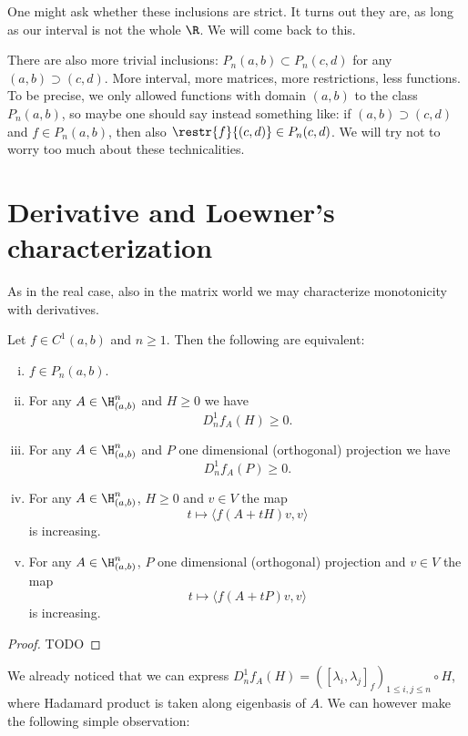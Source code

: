One might ask whether these inclusions are strict. It turns out they are, as long as our interval is not the whole $\R$. We will come back to this.

There are also more trivial inclusions: $P_{n}(a, b) \subset P_{n}(c, d)$ for any $(a, b) \supset (c, d)$. More interval, more matrices, more restrictions, less functions. To be precise, we only allowed functions with domain $(a, b)$ to the class $P_{n}(a, b)$, so maybe one should say instead something like: if $(a, b) \supset (c, d)$ and $f \in P_{n}(a, b)$, then also $\restr{f}{(c, d)} \in P_{n}(c, d)$. We will try not to worry too much about these technicalities.

\section{Derivative and Loewner's characterization}

As in the real case, also in the matrix world we may characterize monotonicity with derivatives.

\begin{lause}\label{monotone_derivative}
	Let $f \in C^{1}(a, b)$ and $n \geq 1$. Then the following are equivalent:
	\begin{enumerate}[(i)]
	\item $f \in P_{n}(a, b)$.
	\item For any $A \in \H^{n}_{(a, b)}$ and $H \geq 0$ we have
	\[
		D^{1}_{n}f_{A}(H) \geq 0.
	\]
	\item For any $A \in \H^{n}_{(a, b)}$ and $P$ one dimensional (orthogonal) projection we have
	\[
		D^{1}_{n}f_{A}(P) \geq 0.
	\]
	\item For any $A \in \H^{n}_{(a, b)}$, $H \geq 0$ and $v \in V$ the map
	\[
		t \mapsto \langle f(A + t H) v, v \rangle
	\]
	is increasing.
	\item For any $A \in \H^{n}_{(a, b)}$, $P$ one dimensional (orthogonal) projection and $v \in V$ the map
	\[
		t \mapsto \langle f(A + t P) v, v \rangle
	\]
	is increasing.
	\end{enumerate}
\end{lause}
\begin{proof}
	TODO
\end{proof}

We already noticed that we can express $D^{1}_{n}f_{A}(H) = ([\lambda_{i}, \lambda_{j}]_{f})_{1 \leq i, j \leq n}\circ H$, where Hadamard product is taken along eigenbasis of $A$. We can however make the following simple observation:


